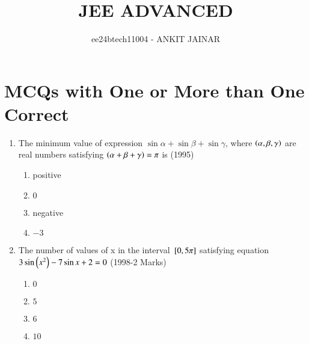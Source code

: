 \documentclass[journal,12pt,twocolumn]{IEEEtran}
\theoremstyle{remark}
\begin{document}

\vspace{3cm}

\title{JEE ADVANCED}
\author{ee24btech11004 - ANKIT JAINAR}
\maketitle
\newpage
\bigskip

\renewcommand{\thefigure}{\theenumi}
\renewcommand{\thetable}{\theenumi}
\section{MCQs with One or More than One Correct}
\begin{enumerate}
\item The minimum value of expression $\sin{\alpha} + \sin{\beta} + \sin{\gamma}$, where $\left(\alpha,\beta,\gamma\right)$ are real numbers satisfying $\left(\alpha+\beta+\gamma\right)=\pi$  is \hfill(1995)
\begin{enumerate}
    \item positive
    \item $0$
    \item negative 
    \item $-3$
\end{enumerate}
\item The number of values of x in the interval ${}\left[0,5\pi\right]$ satisfying equation $3 \sin{\ensuremath{\left(x^2\right)}}-7 \sin{x+2}=0$ \hfill(1998-2 Marks) 
\begin{enumerate}
    \item $0$
    \item $5$
    \item $6$
    \item $10$
\end{enumerate}


\end{enumerate}
\end{document}
